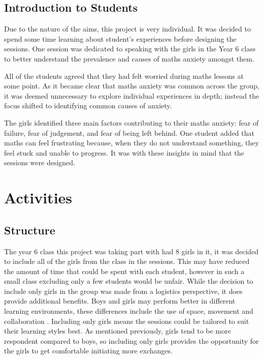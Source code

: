 \documentclass[11pt, a4paper, notitlepage]{article}
\begin{document}
\subsection{Introduction to Students}
Due to the nature of the aims, this project is very individual. It was decided to spend some time learning about student's experiences before designing the sessions. One session was dedicated to speaking with the girls in the Year 6 class to better understand the prevalence and causes of maths anxiety amongst them.
\par
 All of the students agreed that they had felt worried during maths lessons at some point. As it became clear that maths anxiety was common across the group, it was deemed unnecessary to explore individual experiences in depth; instead the focus shifted to identifying common causes of anxiety.
\par
The girls identified three main factors contributing to their maths anxiety: fear of failure, fear of judgement, and fear of being left behind. One student added that maths can feel frustrating because, when they do not understand something, they feel stuck and unable to progress. It was with these insights in mind that the sessions were designed.

\section{Activities}

\subsection{Structure}
The year 6 class this project was taking part with had 8 girls in it, it was decided to include all of the girls from the class in the sessions. This may have reduced the amount of time that could be spent with each student, however in such a small class excluding only a few students would be unfair. While the decision to include only girls in the group was made from a logistics perspective, it does provide additional benefits. Boys and girls may perform better in different learning environments, these differences include the use of space, movement and collaboration \cite{Hughes:2006}. Including only girls means the sessions could be tailored to suit their learning styles best. As mentioned previously, girls tend to be more respondent compared to boys, so including only girls provides the opportunity for the girls to get comfortable initiating more exchanges.
\end{document}
